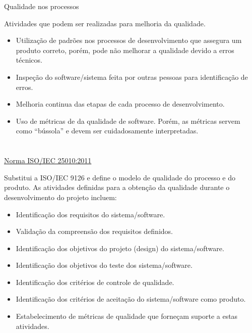 \begin{frame}{Qualidade nos processos}

Atividades que podem ser realizadas para melhoria da qualidade.
\pause
\begin{itemize}[<+->]
\item Utilização de padrões nos processos de desenvolvimento que assegura um produto correto, porém, pode não melhorar a qualidade devido a erros técnicos.
\item Inspeção do software/sistema feita por outras pessoas para identificação de erros.
\item Melhoria continua das etapas de cada processo de desenvolvimento.
\item Uso de métricas de da qualidade de software. Porém, as métricas servem como ``bússola'' e devem ser cuidadosamente interpretadas.
\end{itemize}

\end{frame}

\section{\insertlecture}

\begin{frame}{\href{http://www.iso.org/iso/catalogue_detail.htm?csnumber=35733}{Norma ISO/IEC 25010:2011}}%

Substitui a ISO/IEC 9126 e define o modelo de qualidade do processo e
do produto. As atividades definidas para a obtenção da qualidade
durante o desenvolvimento do projeto incluem:
\pause
\begin{itemize}[<+->]
\item Identificação dos requisitos do sistema/software.
\item Validação da compreensão dos requisitos definidos.
\item Identificação dos objetivos do projeto (design) do sistema/software.
\item Identificação dos objetivos do teste dos sistema/software.
\item Identificação dos critérios de controle de qualidade.
\item Identificação dos critérios de aceitação do sistema/software como produto.
\item Estabelecimento de métricas de qualidade que forneçam suporte a estas atividades.
\end{itemize}

\end{frame}

